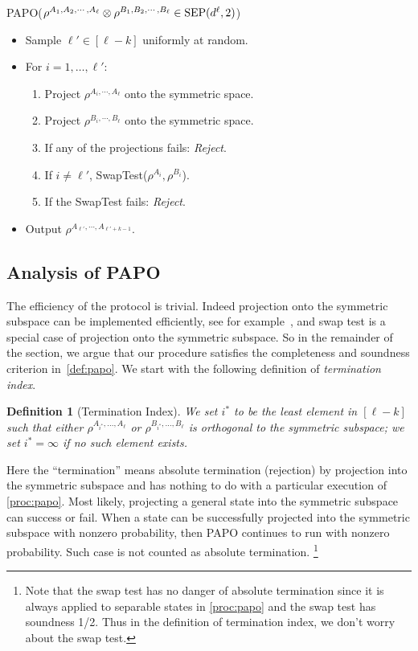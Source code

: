 \documentclass[10pt,a4paper]{article}
\newtheorem{definition}[theorem]{Definition}
\theoremstyle{remark}
\newcommand{\1}[1]{\mathds{1}{[#1]}}
\newcommand{\SEP}{\textup{SEP}}
\numberwithin{equation}{section}
\begin{document}
\begin{algorithm}[H]{PAPO}{($\rho^{A_1,A_2,\cdots, A_\ell}\otimes \rho^{B_1, B_2,\cdots, B_\ell} \in \SEP(d^\ell,2)$)}
     \begin{itemize}
      \item Sample $\ell' \in [\ell-k]$ uniformly at random.
      \item For $i=1,\ldots,\ell'$: \begin{enumerate}
           \item Project $\rho^{A_i, \cdots, A_\ell}$ onto the symmetric space.
           \item Project $\rho^{B_i,\cdots, B_\ell}$ onto the symmetric space.
           \item If any of the projections fails:  \emph{Reject}.
           \item If $i\not=\ell'$, SwapTest($\rho^{A_i}, \rho^{B_i}$).
           \item If the SwapTest fails:  \emph{Reject}.
          \end{enumerate}
      \item Output $\rho^{A_{\ell'},\cdots, A_{\ell'+k-1}}$.
     \end{itemize}
     \caption{PAPO}\label{proc:papo}
\end{algorithm}

\subsection{Analysis of PAPO}
The efficiency of the protocol is trivial. Indeed projection onto the symmetric subspace can be implemented efficiently, see for example~\cite{BBDEJM97}, and swap test is a special case of projection onto the symmetric subspace. So in the remainder of the
section, we argue that our procedure satisfies the completeness and
soundness criterion in~\cref{def:papo}. We start with the following
definition of \emph{termination index}.

\begin{definition}[Termination Index]\label{def:term_index}
  We set $i^*$ to be the least element in $[\ell-k]$ such that either $\rho^{A_{i^*},\ldots, A_\ell}$ or  $\rho^{B_{i^*},\ldots, B_\ell}$
  is orthogonal to the symmetric subspace; we set $i^*=\infty$ if no such element exists.
\end{definition}
Here the ``termination'' means absolute termination (rejection) by projection into the symmetric subspace and has nothing to do with a particular execution of \cref{proc:papo}.
Most likely, projecting a general state into the symmetric subspace can success or fail. 
When a state can be successfully projected into the symmetric subspace with nonzero probability, then PAPO  continues to run with nonzero probability. Such case is not counted as absolute termination. \footnote{Note that the swap test has no danger of absolute termination since it is always applied to separable states in \cref{proc:papo} and the swap test has soundness 1/2. Thus in the definition of termination index, we don't worry about the swap test.}
\end{document}
